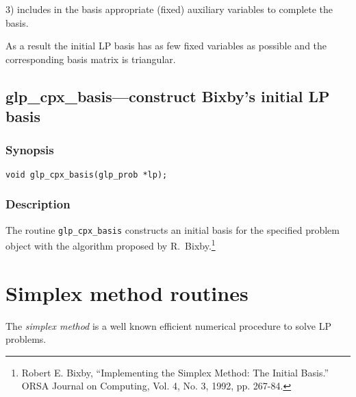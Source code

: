 3) includes in the basis appropriate (fixed) auxiliary variables to
complete the basis.

As a result the initial LP basis has as few fixed variables as possible
and the corresponding basis matrix is triangular.

\subsection{glp\_cpx\_basis---construct Bixby's initial LP basis}

\subsubsection*{Synopsis}

\begin{verbatim}
void glp_cpx_basis(glp_prob *lp);
\end{verbatim}

\subsubsection*{Description}

The routine \verb|glp_cpx_basis| constructs an initial basis for the
specified problem object with the algorithm proposed by
R.~Bixby.\footnote{Robert E. Bixby, ``Implementing the Simplex Method:
The Initial Basis.'' ORSA Journal on Computing, Vol. 4, No. 3, 1992,
pp. 267-84.}


\newpage

\section{Simplex method routines}

The {\it simplex method} is a well known efficient numerical procedure
to solve LP problems.

